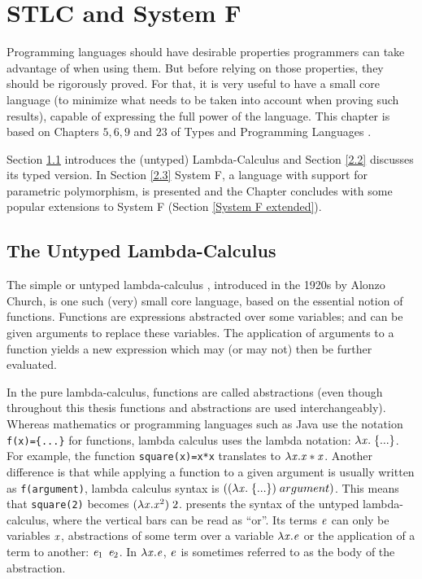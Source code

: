 \chapter{STLC and System F}
\label{cha:2}
Programming languages should have desirable properties programmers can take advantage of when using them. But before relying on those properties, they should be rigorously proved. For that, it is very useful to have a small core language (to minimize what needs to be taken into account when proving such results), capable of expressing the full power of the language. This chapter is based on Chapters $5,6,9$ and $23$ of Types and Programming Languages \cite{tapl}.

Section \ref{2.1} introduces the (untyped) Lambda-Calculus and Section \ref{2.2} discusses its typed version. In Section \ref{2.3} System F, a language with support for parametric polymorphism, is presented and the Chapter concludes with some popular extensions to System F (Section \ref{System F extended}).

\section{The Untyped Lambda-Calculus}
\label{2.1}
The simple or untyped lambda-calculus \cite{lambdacalculus}, introduced in the 1920s by Alonzo Church, is one such (very) small core language, based on the essential notion of functions. Functions are expressions abstracted over some variables; and can be given arguments to replace these variables. The application of arguments to a function yields a new expression which may (or may not) then be further evaluated.

In the pure lambda-calculus, functions are called abstractions (even though throughout this thesis functions and abstractions are used interchangeably). Whereas mathematics or programming languages such as Java use the notation \texttt{f(x)=\{...\}} for functions, lambda calculus uses the lambda notation: $\lambda \mathit{x} .\; \{...\}$. For example, the function \texttt{square(x)=x*x} translates to $\lambda \mathit{x} . \mathit{x}*\mathit{x}$.  Another difference is that while applying a function to a given argument is usually written as \texttt{f(argument)}, lambda calculus syntax is $((\lambda \mathit{x} .\;\{...\} ) \; argument)$. This means that \texttt{square(2)} becomes $(\lambda \mathit{x} . \mathit{x}^2)\;2$.  presents the syntax of the untyped lambda-calculus, where the vertical bars can be read as ``or''. Its terms $\mathit{e}$ can only be variables $\mathit{x}$, abstractions of some term over a variable $\lambda \mathit{x}. \mathit{e}$ or the application of a term to another: $\mathit{e}_1$ $\mathit{e}_2$.  In $\lambda \mathit{x}. \mathit{e}$, $\mathit{e}$ is sometimes referred to as the body of the abstraction.

